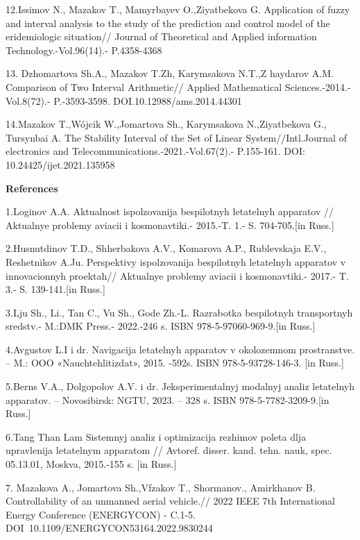 12.Issimov N., Mazakov T., Mamyrbayev O.,Ziyatbekova G. Application of
fuzzy and interval analysis to the study of the prediction and control
model of the eridemiologic situation// Journal of Theoretical and
Applied information Technology.-Vol.96(14).- P.4358-4368

13. Dzhomartova Sh.A., Mazakov T.Zh, Karymsakova N.T.,Z haydarov A.M.
Comparison of Two Interval Arithmetic// Applied Mathematical
Sciences.-2014.-Vol.8(72).- P.-3593-3598. DOI.10.12988/ams.2014.44301

14.Mazakov T.,Wójcik W.,Jomartova Sh., Karymsakova N.,Ziyatbekova G.,
Tursynbai A. The Stability Interval of the Set of Linear
System//Intl.Journal of electronics and
Telecommunications.-2021.-Vol.67(2).- P.155-161. DOI:
10.24425/ijet.2021.135958

{\bfseries References}

1.Loginov A.A. Aktual\textquotesingle nost\textquotesingle{}
ispol\textquotesingle zovanija bespilotnyh letatel\textquotesingle nyh
apparatov // Aktual\textquotesingle nye problemy aviacii i
kosmonavtiki.- 2015.-T. 1.- S. 704-705.{[}in Russ.{]}

2.Husnutdinov T.D., Shherbakova A.V., Komarova A.P., Rublevskaja E.V.,
Reshetnikov A.Ju. Perspektivy ispol\textquotesingle zovanija bespilotnyh
letatel\textquotesingle nyh apparatov v innovacionnyh proektah//
Aktual\textquotesingle nye problemy aviacii i kosmonavtiki.- 2017.- T.
3.- S. 139-141.{[}in Russ.{]}

3.Lju Sh., Li., Tan C., Vu Sh., God\textquotesingle e Zh.-L. Razrabotka
bespilotnyh transportnyh sredstv.- M.:DMK Press.- 2022.-246 s. ISBN
978-5-97060-969-9.{[}in Russ.{]}

4.Avgustov L.I i dr. Navigacija letatel\textquotesingle nyh apparatov v
okolozemnom prostranstve. -- M.: OOO «Nauchtehlitizdat», 2015. -592s.
ISBN 978-5-93728-146-3. {[}in Russ.{]}

5.Berns V.A., Dolgopolov A.V. i dr. Jeksperimental\textquotesingle nyj
modal\textquotesingle nyj analiz letatel\textquotesingle nyh apparatov.
-- Novosibirsk: NGTU, 2023. -- 328 s. ISBN 978-5-7782-3209-9.{[}in
Russ.{]}

6.Tang Than\textquotesingle{} Lam Sistemnyj analiz i optimizacija
rezhimov poleta dlja upravlenija letatel\textquotesingle nym apparatom
// Avtoref. disser. kand. tehn. nauk, spec. 05.13.01, Moskva, 2015.-155
s. {[}in Russ.{]}

7. Mazakova A., Jomartova Sh.,Vfzakov T., Shormanov., Amirkhanov B.
Controllability of an unmanned aerial vehicle.// 2022 IEEE 7th
International Energy Conference (ENERGYCON) - C.1-5.
DOI~10.1109/ENERGYCON53164.2022.9830244

